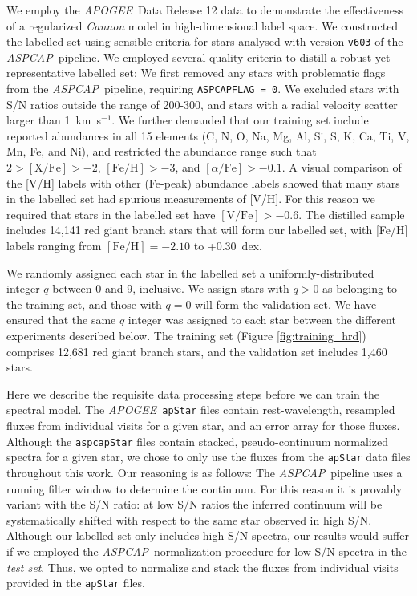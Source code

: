 \documentclass[12pt,preprint]{aastex}
\newcommand{\project}[1]{\textsl{#1}}
\newcommand{\acronym}[1]{{\small{#1}}}
\newcommand{\apogee}{\project{\acronym{APOGEE}}}
\newcommand{\aspcap}{\project{\acronym{ASPCAP}}}
\begin{document}
We employ the \apogee\ Data Release 12 data to demonstrate the effectiveness of
a regularized \emph{Cannon} model in high-dimensional label space.  We 
constructed the labelled set using sensible criteria for stars analysed with 
version \texttt{v603} of the \aspcap\ pipeline.  We employed several quality 
criteria to distill a robust yet representative labelled set: We first removed 
any stars with problematic flags from the \aspcap\ pipeline, requiring 
\texttt{ASPCAPFLAG~=~0}.  We excluded stars with S/N ratios outside the range of
200-300, and stars with a radial velocity scatter larger than 1~km~s$^{-1}$.  We
further demanded that our training set include reported abundances in all 15 
elements (C, N, O, Na, Mg, Al, Si, S, K, Ca, Ti, V, Mn, Fe, and Ni), and 
restricted the abundance range such that $2 > \mathrm{[X/Fe]} > -2$, 
$\mathrm{[Fe/H]} > -3$, and $[\alpha/\mathrm{Fe}] > -0.1$.  A visual comparison 
of the [V/H] labels with other (Fe-peak) abundance labels showed that many stars
in the labelled set had spurious measurements of [V/H].  For this reason we 
required that stars in the labelled set have $\mathrm{[V/Fe]} > -0.6$.  The 
distilled sample includes 14,141 red giant branch stars that will form our 
labelled set, with [Fe/H] labels ranging from $\mathrm{[Fe/H]} = -2.10$ to 
+0.30~dex.


We randomly assigned each star in the labelled set a uniformly-distributed 
integer $q$ between 0 and 9, inclusive.  We assign stars with $q > 0$ as 
belonging to the training set, and those with $q = 0$ will form the validation 
set.  We have ensured that the same $q$ integer was assigned to each star 
between the different experiments described below.  The training set (Figure
\ref{fig:training_hrd}) comprises 12,681 red giant branch stars, and the 
validation set includes 1,460 stars.


Here we describe the requisite data processing steps before we can train the 
spectral model.  The \apogee\ \texttt{apStar} files contain rest-wavelength, 
resampled fluxes from individual visits for a given star, and an error array for
those fluxes.  Although the \texttt{aspcapStar} files contain stacked, 
pseudo-continuum normalized spectra for a given star, we chose to only use the 
fluxes from the \texttt{apStar} data files throughout this work.  Our reasoning 
is as follows: The \aspcap\ pipeline uses a running filter window to determine 
the continuum.  For this reason it is provably variant with the S/N ratio: at 
low S/N ratios the inferred continuum will be systematically shifted with 
respect to the same star observed in high S/N.  Although our labelled set only 
includes high S/N spectra, our results would suffer if we employed the \aspcap\ 
normalization procedure for low S/N spectra in the \emph{test set}.  Thus, we 
opted to normalize and stack the fluxes from individual visits provided in the 
\texttt{apStar} files.
\end{document}
